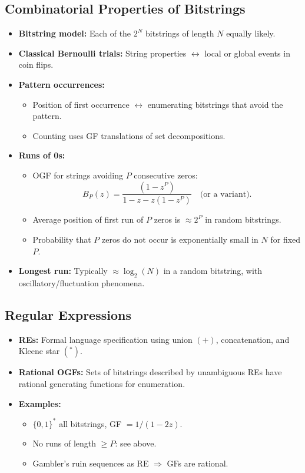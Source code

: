 \documentclass[11pt,letterpaper]{article}
\begin{document}
\subsection{Combinatorial Properties of Bitstrings}
\begin{itemize}
  \item \textbf{Bitstring model:} Each of the $2^N$ bitstrings of length $N$ equally likely.
  \item \textbf{Classical Bernoulli trials:} String properties $\leftrightarrow$ local or global events in coin flips.
  \item \textbf{Pattern occurrences:} 
    \begin{itemize}
      \item Position of first occurrence $\leftrightarrow$ enumerating bitstrings that avoid the pattern.
      \item Counting uses GF translations of set decompositions.
    \end{itemize}
  \item \textbf{Runs of 0s:} 
    \begin{itemize}
      \item OGF for strings avoiding $P$ consecutive zeros:
        \[
          B_P(z) = \frac{(1-z^P)}{1-z - z(1-z^P)} \quad\text{(or a variant).}
        \]
      \item Average position of first run of $P$ zeros is $\approx 2^P$ in random bitstrings.
      \item Probability that $P$ zeros do not occur is exponentially small in $N$ for fixed $P$.
    \end{itemize}
  \item \textbf{Longest run:} Typically $\approx \log_2(N)$ in a random bitstring, with oscillatory/fluctuation phenomena.
\end{itemize}

\subsection{Regular Expressions}
\begin{itemize}
  \item \textbf{REs:} Formal language specification using union $(+)$, concatenation, and Kleene star $(^*)$.
  \item \textbf{Rational OGFs:} Sets of bitstrings described by unambiguous REs have rational generating functions for enumeration.
  \item \textbf{Examples:} 
    \begin{itemize}
      \item $\{0,1\}^*$ all bitstrings, GF $= 1/(1-2z)$.
      \item No runs of length $\ge P$: see above.
      \item Gambler's ruin sequences as RE $\Rightarrow$ GFs are rational.
    \end{itemize}
\end{itemize}
\end{document}
